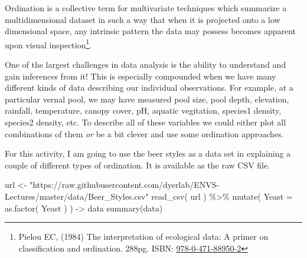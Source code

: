 \documentclass[
  letterpaper,
]{book}
\newenvironment{Shaded}{\begin{snugshade}}{\end{snugshade}}
\newcommand{\AttributeTok}[1]{\textcolor[rgb]{0.40,0.45,0.13}{#1}}
\newcommand{\FunctionTok}[1]{\textcolor[rgb]{0.28,0.35,0.67}{#1}}
\newcommand{\NormalTok}[1]{\textcolor[rgb]{0.00,0.23,0.31}{#1}}
\newcommand{\OtherTok}[1]{\textcolor[rgb]{0.00,0.23,0.31}{#1}}
\newcommand{\SpecialCharTok}[1]{\textcolor[rgb]{0.37,0.37,0.37}{#1}}
\newcommand{\StringTok}[1]{\textcolor[rgb]{0.13,0.47,0.30}{#1}}
\begin{document}
Ordination is a collective term for multivariate techniques which
summarize a multidimensional dataset in such a way that when it is
projected onto a low dimensional space, any intrinsic pattern the data
may possess becomes apparent upon visual inspection\footnote{Pielou EC,
  (1984) The interpretation of ecological data: A primer on
  classification and ordination. 288pg. ISBN:
  \href{https://www.wiley.com/en-us/The+Interpretation+of+Ecological+Data\%3A+A+Primer+on+Classification+and+Ordination-p-9780471889502}{978-0-471-88950-2}}.

One of the largest challenges in data analysis is the ability to
understand and gain inferences from it! This is especially compounded
when we have many different kinds of data describing our individual
observations. For example, at a particular vernal pool, we may have
measured pool size, pool depth, elevation, rainfall, temperature, canopy
cover, pH, aquatic vegitation, species1 density, species2 density, etc.
To describe all of these variables we could either plot all combinations
of them \emph{or} be a bit clever and use some ordination approaches.

For this activity, I am going to use the beer styles as a data set in
explaining a couple of different types of ordination. It is available as
the raw CSV file.

\begin{Shaded}
\begin{Highlighting}[]
\NormalTok{url }\OtherTok{\textless{}{-}} \StringTok{"https://raw.githubusercontent.com/dyerlab/ENVS{-}Lectures/master/data/Beer\_Styles.csv"}
\FunctionTok{read\_csv}\NormalTok{( url ) }\SpecialCharTok{\%\textgreater{}\%}
  \FunctionTok{mutate}\NormalTok{( }\AttributeTok{Yeast =} \FunctionTok{as.factor}\NormalTok{( Yeast ) ) }\OtherTok{{-}\textgreater{}}\NormalTok{ data}
\FunctionTok{summary}\NormalTok{(data)}
\end{Highlighting}
\end{Shaded}
\end{document}
